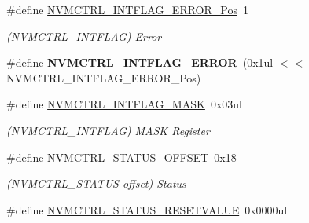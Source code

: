 \begin{DoxyCompactItemize}
\item 
\hypertarget{group___s_a_m_l21___n_v_m_c_t_r_l_gad0ee9e136df1b894499ee13b6509c08f}{}\#define \hyperlink{group___s_a_m_l21___n_v_m_c_t_r_l_gad0ee9e136df1b894499ee13b6509c08f}{N\+V\+M\+C\+T\+R\+L\+\_\+\+I\+N\+T\+F\+L\+A\+G\+\_\+\+E\+R\+R\+O\+R\+\_\+\+Pos}~1\label{group___s_a_m_l21___n_v_m_c_t_r_l_gad0ee9e136df1b894499ee13b6509c08f}

\begin{DoxyCompactList}\small\item\em (N\+V\+M\+C\+T\+R\+L\+\_\+\+I\+N\+T\+F\+L\+A\+G) Error \end{DoxyCompactList}\item 
\hypertarget{group___s_a_m_l21___n_v_m_c_t_r_l_ga4dc7bd2f8228424f2f305284a0425d64}{}\#define {\bfseries N\+V\+M\+C\+T\+R\+L\+\_\+\+I\+N\+T\+F\+L\+A\+G\+\_\+\+E\+R\+R\+O\+R}~(0x1ul $<$$<$ N\+V\+M\+C\+T\+R\+L\+\_\+\+I\+N\+T\+F\+L\+A\+G\+\_\+\+E\+R\+R\+O\+R\+\_\+\+Pos)\label{group___s_a_m_l21___n_v_m_c_t_r_l_ga4dc7bd2f8228424f2f305284a0425d64}

\item 
\hypertarget{group___s_a_m_l21___n_v_m_c_t_r_l_ga77cb82e875b1988ba35455d842df74c5}{}\#define \hyperlink{group___s_a_m_l21___n_v_m_c_t_r_l_ga77cb82e875b1988ba35455d842df74c5}{N\+V\+M\+C\+T\+R\+L\+\_\+\+I\+N\+T\+F\+L\+A\+G\+\_\+\+M\+A\+S\+K}~0x03ul\label{group___s_a_m_l21___n_v_m_c_t_r_l_ga77cb82e875b1988ba35455d842df74c5}

\begin{DoxyCompactList}\small\item\em (N\+V\+M\+C\+T\+R\+L\+\_\+\+I\+N\+T\+F\+L\+A\+G) M\+A\+S\+K Register \end{DoxyCompactList}\item 
\hypertarget{group___s_a_m_l21___n_v_m_c_t_r_l_gaa210cb991451778d9df1a804b189799a}{}\#define \hyperlink{group___s_a_m_l21___n_v_m_c_t_r_l_gaa210cb991451778d9df1a804b189799a}{N\+V\+M\+C\+T\+R\+L\+\_\+\+S\+T\+A\+T\+U\+S\+\_\+\+O\+F\+F\+S\+E\+T}~0x18\label{group___s_a_m_l21___n_v_m_c_t_r_l_gaa210cb991451778d9df1a804b189799a}

\begin{DoxyCompactList}\small\item\em (N\+V\+M\+C\+T\+R\+L\+\_\+\+S\+T\+A\+T\+U\+S offset) Status \end{DoxyCompactList}\item 
\hypertarget{group___s_a_m_l21___n_v_m_c_t_r_l_gac30e36e00c486c218383a4d318fe59c8}{}\#define \hyperlink{group___s_a_m_l21___n_v_m_c_t_r_l_gac30e36e00c486c218383a4d318fe59c8}{N\+V\+M\+C\+T\+R\+L\+\_\+\+S\+T\+A\+T\+U\+S\+\_\+\+R\+E\+S\+E\+T\+V\+A\+L\+U\+E}~0x0000ul\label{group___s_a_m_l21___n_v_m_c_t_r_l_gac30e36e00c486c218383a4d318fe59c8}


\end{DoxyCompactItemize}
